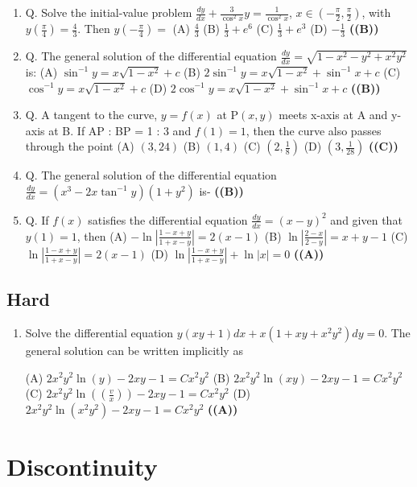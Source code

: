 \documentclass{article}
\begin{document}
\begin{enumerate}
(A) 38.1 kg
(B) 45.0 kg
(C) 33.6 kg
(D) 50.0 kg \hfill \textbf{((A))}
\item Q. Solve the initial-value problem $\frac{dy}{dx} + \frac{3}{\cos^2 x} y = \frac{1}{\cos^2 x}$, $x \in (-\frac{\pi}{2}, \frac{\pi}{2})$, with $y(\frac{\pi}{4}) = \frac{4}{3}$. Then $y(-\frac{\pi}{4}) =$
(A) $\frac{4}{3}$
(B) $\frac{1}{3} + e^6$
(C) $\frac{1}{3} + e^3$
(D) $-\frac{1}{3}$ \hfill \textbf{((B))}
\item Q. The general solution of the differential equation $\frac{dy}{dx} = \sqrt{1 - x^2 - y^2 + x^2y^2}$ is:
(A) $\sin^{-1}y = x\sqrt{1-x^2} + c$
(B) $2\sin^{-1} y = x\sqrt{1-x^2} + \sin^{-1}x + c$
(C) $\cos^{-1} y = x\sqrt{1-x^2} + c$
(D) $2\cos^{-1}y = x\sqrt{1-x^2} + \sin^{-1}x + c$ \hfill \textbf{((B))}
\item Q. A tangent to the curve, $y = f(x)$ at P$(x, y)$ meets x-axis at A and y-axis at B. If AP : BP = 1 : 3 and $f(1) = 1$, then the curve also passes through the point
(A) $(3,24)$
(B) $(1,4)$
(C) $(2,\frac{1}{8})$
(D) $(3,\frac{1}{28})$ \hfill \textbf{((C))}
\item Q. The general solution of the differential equation $\frac{dy}{dx} = (x^3 - 2x \tan^{-1} y) (1 + y^2)$ is- \hfill \textbf{((B))}
\item Q. If $f(x)$ satisfies the differential equation $\frac{dy}{dx} = (x - y)^2$ and given that $y(1) = 1$, then
(A) $-\ln \left|\frac{1-x+y}{1+x-y}\right| = 2(x - 1)$
(B) $\ln \left|\frac{2-x}{2-y}\right| = x+y-1$
(C) $\ln \left|\frac{1-x+y}{1+x-y}\right| = 2(x - 1)$
(D) $\ln \left|\frac{1-x+y}{1+x-y}\right| + \ln |x| = 0$ \hfill \textbf{((A))}
\end{enumerate}
\subsection{Hard}
\begin{enumerate}
\item Solve the differential equation $y(xy+1) dx + x(1+xy+x^2y^2) dy = 0$.
The general solution can be written implicitly as

(A) $2x^2y^2 \ln(y) - 2xy - 1 = Cx^2y^2$
(B) $2x^2y^2 \ln(xy) - 2xy - 1 = Cx^2y^2$
(C) $2x^2y^2 \ln((\frac{v}{x})) - 2xy - 1 = Cx^2y^2$
(D) $2x^2y^2 \ln(x^2y^2) - 2xy - 1 = Cx^2y^2$ \hfill \textbf{((A))}
\end{enumerate}
\section{Discontinuity}
\end{document}
